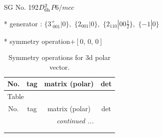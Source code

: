 \documentclass[fleqn,8pt]{jsarticle}
\begin{document}
\setcounter{MaxMatrixCols}{32}

\renewcommand{\tablename}{Table~}
\renewcommand{\figurename}{Figure~}
\begin{center}
\LARGE
SG No. 192\quad$D_{\rm 6h}^{2}$\quad$P6/mcc$\quad[ hexagonal ]
\end{center}

* generator : $\{3^{+}_{\,\,001}|0\},\,\,\{2{}_{001}|0\},\,\,\{2{}_{110}|0 0 \frac{1}{2}\},\,\,\{-1|0\}$

* symmetry operation\quad$+\left[ 0,\, 0,\, 0 \right]$
\renewcommand{\arraystretch}{1.3}
\begin{longtable}{cccc}
\caption{Symmetry operations for 3d polar vector.}
 \\
 \hline \hline
No. & tag & matrix (polar) & det \\ \hline \endfirsthead

\multicolumn{3}{l}{\tablename\ \thetable{}} \\
 \hline \hline
No. & tag & matrix (polar) & det \\ \hline \endhead

 \hline \hline
\multicolumn{3}{r}{\footnotesize\it continued ...} \\ \endfoot

 \hline \hline
\multicolumn{3}{r}{} \\ \endlastfoot


\end{longtable}
\end{document}
